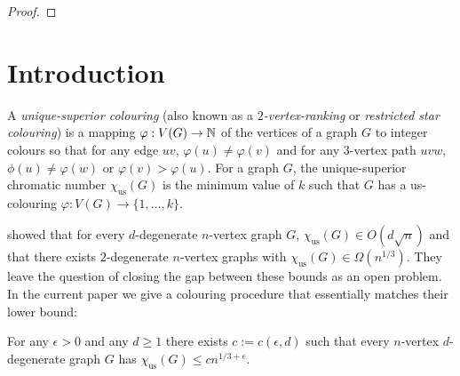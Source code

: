 \documentclass[kpfonts]{patmorin}
\newcommand{\defin}[1]{\emph{\color{brightmaroon}#1}}
\newcommand{\trn}{\chi_{\mathrm{us}}}
\begin{document}
\begin{proof}
\end{proof}




\section{Introduction}

A \defin{unique-superior colouring} (also known as a \defin{$2$-vertex-ranking} or \defin{restricted star colouring}) is a mapping $\varphi:V(G)\to\mathbb{N}$ of the vertices of a graph $G$ to integer colours so that for any edge $uv$, $\varphi(u)\neq \varphi(v)$ and for any $3$-vertex path $uvw$, $\phi(u)\neq\varphi(w)$ or $\varphi(v)>\varphi(u)$.  For a graph $G$, the unique-superior chromatic number $\trn(G)$ is the minimum value of $k$ such that $G$ has a us-colouring $\varphi:V(G)\to\{1,\ldots,k\}$.

\citet{karpas.neiman.ea:on} showed that for every $d$-degenerate $n$-vertex graph $G$, $\trn(G)\in O(d\sqrt{n})$ and that there exists $2$-degenerate $n$-vertex graphs with $\trn(G)\in\Omega(n^{1/3})$.  They leave the question of closing the gap between these bounds as an open problem. In the current paper we give a colouring procedure that essentially matches their lower bound:

\begin{thm}\label{d_degenerate_upper_bound}
  For any $\epsilon >0$ and any $d\ge 1$ there exists $c:=c(\epsilon,d)$ such that every $n$-vertex $d$-degenerate graph $G$ has $\trn(G) \le c n^{1/3+\epsilon}$.
\end{thm}
\end{document}
